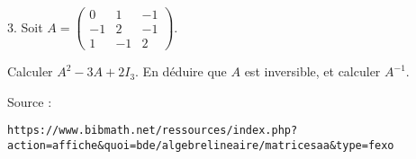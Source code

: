 \vspace{.323cm}
\begin{minipage}[c]{.45\linewidth}
3. Soit $A=\begin{pmatrix} 
0&1&-1\\-1&2&-1\\1&-1&2
\end{pmatrix}$.
\end{minipage}
\hfill
\begin{minipage}[c]{.45\linewidth}
Calculer $A^2-3A+2I_3$. En déduire que $A$ est inversible, et calculer $A^{-1}$.
\end{minipage}

\vspace{.323cm}
{\scriptsize Source : 

\texttt{https://www.bibmath.net/ressources/index.php?action=affiche\&quoi=bde/algebrelineaire/matricesaa\&type=fexo}}


